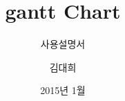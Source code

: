 \documentclass[ aspectratio=169,  12pt,blue,xcolor=pdftex,dvipsnames,table,handout,notes]{beamer}
\begin{document}
	

			\title{gantt Chart}
			\subtitle{사용설명서}
			\author{김대희}
			\date[2011.11.10]{2015년 1월}



		\begin{frame}[plain]
		\titlepage
		\end{frame}




%
%
%
\end{document}
